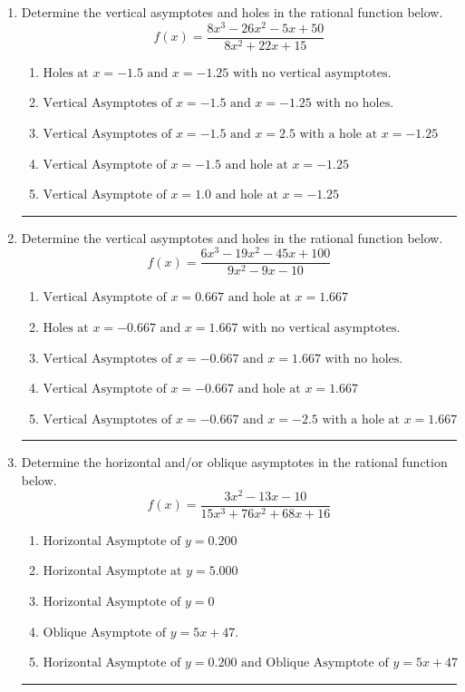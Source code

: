 \documentclass[14pt]{extbook}
\newcommand{\litem}[1]{\item#1\hspace*{-1cm}\rule{\textwidth}{0.4pt}}
\begin{document}
\begin{enumerate}
\litem{
Determine the vertical asymptotes and holes in the rational function below.\[ f(x) = \frac{8x^{3} -26 x^{2} -5 x + 50}{8x^{2} +22 x + 15} \]\begin{enumerate}[label=\Alph*.]
\item \( \text{Holes at } x = -1.5 \text{ and } x = -1.25 \text{ with no vertical asymptotes.} \)
\item \( \text{Vertical Asymptotes of } x = -1.5 \text{ and } x = -1.25 \text{ with no holes.} \)
\item \( \text{Vertical Asymptotes of } x = -1.5 \text{ and } x = 2.5 \text{ with a hole at } x = -1.25 \)
\item \( \text{Vertical Asymptote of } x = -1.5 \text{ and hole at } x = -1.25 \)
\item \( \text{Vertical Asymptote of } x = 1.0 \text{ and hole at } x = -1.25 \)

\end{enumerate} }
\litem{
Determine the vertical asymptotes and holes in the rational function below.\[ f(x) = \frac{6x^{3} -19 x^{2} -45 x + 100}{9x^{2} -9 x -10} \]\begin{enumerate}[label=\Alph*.]
\item \( \text{Vertical Asymptote of } x = 0.667 \text{ and hole at } x = 1.667 \)
\item \( \text{Holes at } x = -0.667 \text{ and } x = 1.667 \text{ with no vertical asymptotes.} \)
\item \( \text{Vertical Asymptotes of } x = -0.667 \text{ and } x = 1.667 \text{ with no holes.} \)
\item \( \text{Vertical Asymptote of } x = -0.667 \text{ and hole at } x = 1.667 \)
\item \( \text{Vertical Asymptotes of } x = -0.667 \text{ and } x = -2.5 \text{ with a hole at } x = 1.667 \)

\end{enumerate} }
\litem{
Determine the horizontal and/or oblique asymptotes in the rational function below.\[ f(x) = \frac{3x^{2} -13 x -10}{15x^{3} +76 x^{2} +68 x + 16} \]\begin{enumerate}[label=\Alph*.]
\item \( \text{Horizontal Asymptote of } y = 0.200  \)
\item \( \text{Horizontal Asymptote at } y = 5.000 \)
\item \( \text{Horizontal Asymptote of } y = 0 \)
\item \( \text{Oblique Asymptote of } y = 5x + 47. \)
\item \( \text{Horizontal Asymptote of } y = 0.200 \text{ and Oblique Asymptote of } y = 5x + 47 \)


\end{enumerate}}
\end{enumerate}
\end{document}
